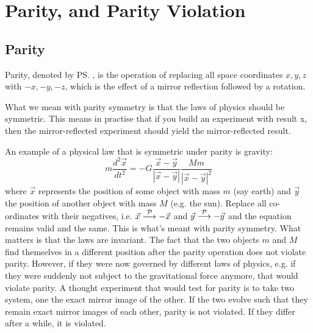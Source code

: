 \section{Parity, and Parity Violation}
\subsection{Parity} 
 Parity, denoted by \ps, is the operation of replacing all space
 coordinates $x, y, z$ with $-x, -y, -z$, which is the effect of a mirror
 reflection followed by a  rotation.

 What we mean with parity symmetry is that the laws of physics should
 be symmetric. This means in practise that if you build an experiment
 with result x, then the mirror-reflected experiment should yield the
 mirror-reflected result.

 An example of a physical law that is symmetric under parity is
 gravity:
\begin{equation}
 m \frac{d^2 \vec{x}}{dt^2} = -G \frac{\vec{x}-\vec{y}}{|\vec{x}-\vec{y}|} 
 \frac{Mm}{|\vec{x}-\vec{y}|^2}
\end{equation}
 where $\vec{x}$ represents the position of some object with mass $m$
 (say earth) and $\vec{y}$ the position of another object with mass
 $M$ (e.g. the sun). Replace all co-ordinates with their negatives,
 i.e. \(\vec{x} \stackrel{\mathcal{P}}{\longrightarrow} -\vec{x}\) and \(\vec{y} \stackrel{\mathcal{P}}{\longrightarrow} -\vec{y}\) and
 the equation remains valid and the same. This is what's meant with
 parity symmetry. What matters is that the laws are invariant.  The
 fact that the two objects $m$ and $M$ find themselves in a different
 position after the parity operation does not violate parity. However,
 if they were now governed by different laws of physics, e.g. if they
 were suddenly not subject to the gravitational force anymore, that
 would violate parity. A thought experiment that would test for parity
 is to take two system, one the exact mirror image of the other. If
 the two evolve such that they remain exact mirror images of each
 other, parity is not violated. If they differ after a while, it is
 violated. 


